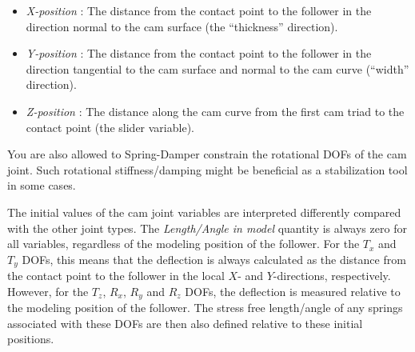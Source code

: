 \begin{itemize}
\item{\sl X-position} :
  The distance from the contact point to the follower in the
  direction normal to the cam surface (the ``thickness'' direction).


\item{\sl Y-position} : The distance from the contact point to the follower
  in the direction tangential to the cam surface and normal to the cam curve
  (``width'' direction).

\item{\sl Z-position} : The distance along the cam curve from the first
  cam triad to the contact point (the slider variable).
\end{itemize}

You are also allowed to Spring-Damper constrain the rotational DOFs of
the cam joint. Such rotational stiffness/damping might be beneficial as
a stabilization tool in some cases.


The initial values of the cam joint variables are interpreted differently
compared with the other joint types.
The {\sl Length/Angle in model} quantity is always zero for all variables,
regardless of the modeling position of the follower.
For the $T_x$ and $T_y$ DOFs, this means that the deflection is always
calculated as the distance from the contact point to the follower in the local
$X$- and $Y$-directions, respectively.
However, for the $T_z$, $R_x$, $R_y$ and $R_z$ DOFs, the deflection is measured
relative to the modeling position of the follower.
The stress free length/angle of any springs associated with these DOFs are then
also defined relative to these initial positions.

